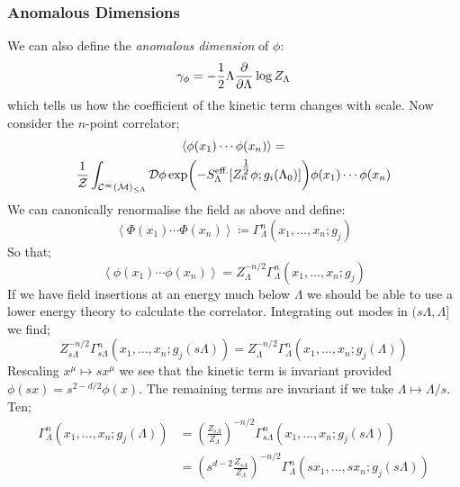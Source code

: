 \subsubsection{Anomalous Dimensions}
We can also define the \emph{anomalous dimension} of $\phi$:
\begin{equation}
\gamma_{\phi} = -\frac{1}{2}\Lambda\frac{\partial}{\partial \Lambda}\log Z_{\Lambda}
\end{equation}
which tells us how the coefficient of the kinetic term changes with scale. Now consider the $n$-point correlator;
\begin{multline*}
\left< \phi(x_1)\cdots \phi(x_n) \right> = \\ \frac{1}{\mZ}\int_{\mC^{\infty}(\mM)_{\leq \Lambda}}{\mD\phi \exp\left(-S_{\Lambda}^{\text{eff.}}[Z_n^{\tfrac{1}{2}}\phi; g_{i}(\Lambda_0)]\right)\phi(x_1)\cdots \phi(x_n)}
\end{multline*}
We can canonically renormalise the field as above and define:
\begin{equation*}
\left< \Phi(x_1)\cdots\Phi(x_n) \right> \coloneqq \Gamma_{\Lambda}^{n}(x_1, \ldots, x_n; g_j)
\end{equation*}
So that;
\begin{equation*}
\left< \phi(x_1)\cdots \phi(x_n) \right> = Z_{\Lambda}^{-n/2}\Gamma_{\Lambda}^{n}(x_1, \ldots, x_n; g_j)
\end{equation*}
If we have field insertions at an energy much below $\Lambda$ we should be able to use a lower energy theory to calculate the correlator. Integrating out modes in $(s\Lambda, \Lambda]$ we find;
\begin{equation*}
Z_{s\Lambda}^{-n/2}\Gamma_{s\Lambda}^{n}\left(x_1, \ldots, x_n; g_j(s\Lambda)\right) = Z_{\Lambda}^{-n/2}\Gamma_{\Lambda}^{n}\left(x_1, \ldots, x_n; g_j(\Lambda) \right)
\end{equation*}
Rescaling $x^{\mu} \mapsto sx^{\mu}$ we see that the kinetic term is invariant provided $\phi(sx) = s^{2 - d/2}\phi(x)$. The remaining terms are invariant if we take $\Lambda \mapsto \Lambda / s$. Ten;
\begin{align*}
\Gamma_{\Lambda}^{n}\left(x_1, \ldots, x_n; g_j(\Lambda)\right) &= \left(\frac{Z_{s\Lambda}}{Z_\Lambda}\right)^{-n/2}\Gamma^{n}_{s\Lambda}\left(x_1, \ldots, x_n; g_j(s\Lambda)\right) \\
&= \left(s^{d - 2}\frac{Z_{s\Lambda}}{Z_\Lambda}\right)^{-n/2}\Gamma_{\Lambda}^{n}\left(sx_1, \ldots, sx_n ; g_j(s\Lambda)\right)
\end{align*}

